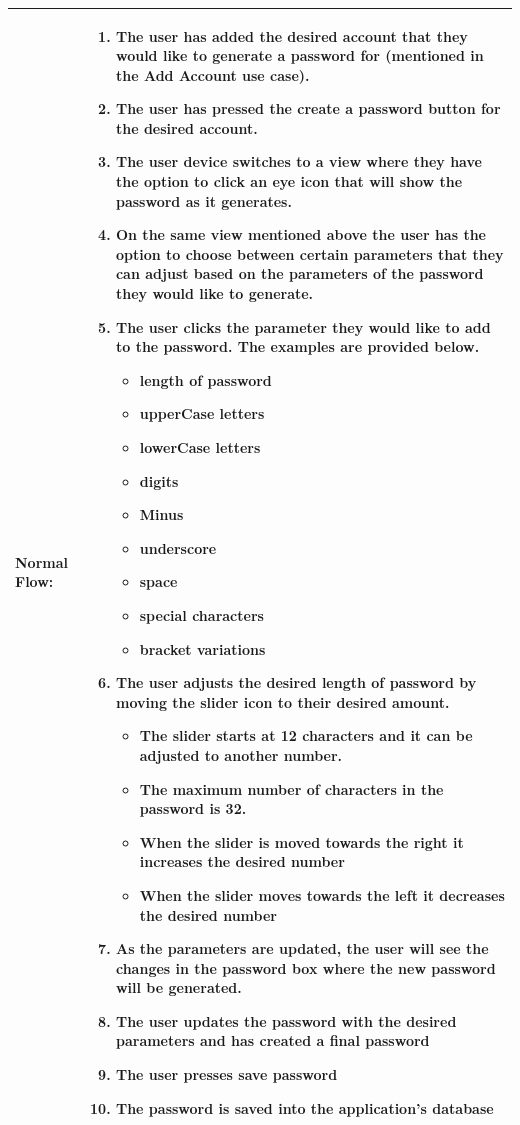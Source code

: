 \documentclass[stu]{apa7}
\begin{document}
{\begin{xltabular}{\textwidth}{|l|X|}
  Normal Flow: & 
    \begin{enumerate}[nosep,after=\strut]
      \item The user has added the desired account that they would like to generate a password for (mentioned in the Add Account use case).
      \item The user has pressed the create a password button for the desired account. 
      \item The user device switches to a view where they have the option to click an eye icon that will show the password as it generates. 
      \item On the same view mentioned above the user has the option to choose between certain parameters that they can adjust based on the parameters of the password they would like to generate.
      \item The user clicks the parameter they would like to add to the password. The examples are provided below. 
        \begin{itemize}
          \item length of password
          \item upperCase letters 
          \item lowerCase letters
          \item digits
          \item Minus
          \item underscore
          \item space
          \item special characters
          \item bracket variations 
        \end{itemize}
    \item The user adjusts the desired length of password by moving the slider icon to their desired amount. 
      \begin{itemize}
          \item The slider starts at 12 characters and it can be adjusted to another number.
          \item The maximum number of characters in the password is 32. 
          \item When the slider is moved towards the right it increases the desired number
          \item When the slider moves towards the left it decreases the desired number
      \end{itemize}
    \item As the parameters are updated, the user will see the changes in the password box where the new password will be generated.
    \item The user updates the password with the desired parameters and has created a final password
    \item The user presses save password
    \item The password is saved into the application's database
    \end{enumerate} \\ \hline


\end{xltabular}}
\end{document}
